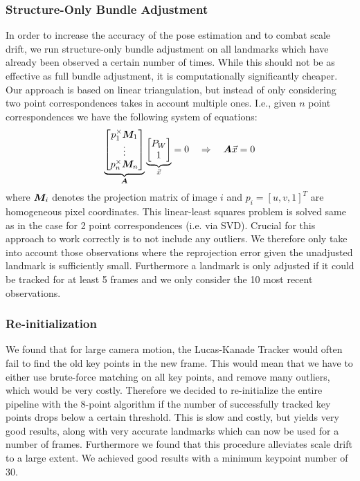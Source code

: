 \documentclass[11pt]{article}
\newcommand{\mat}{\matrixsym}
\begin{document}
\subsubsection{Structure-Only Bundle Adjustment}
In order to increase the accuracy of the pose estimation and to combat scale drift, we run structure-only bundle adjustment on all landmarks which have already been observed a certain number of times. While this should not be as effective as full bundle adjustment, it is computationally significantly cheaper.\\
Our approach is based on linear triangulation, but instead of only considering two point correspondences takes in account multiple ones. I.e., given $n$ point correspondences we have the following system of equations:
\begin{equation*}
\underbrace{\begin{bmatrix} p_1^\times \mat{M}_1\\ \vdots \\ p_n^\times \mat{M}_n \end{bmatrix}}_{\mat{A}} \underbrace{\begin{bmatrix} P_W \\ 1 \end{bmatrix}}_{\vec{x}} = 0 \quad \Rightarrow \quad \mat{A} \vec{x} = 0
\end{equation*}
where $\mat{M}_i$ denotes the projection matrix of image $i$ and $p_i = [u,v,1]^T$ are homogeneous pixel coordinates. This linear-least squares problem is solved same as in the case for 2 point correspondences (i.e. via SVD). Crucial for this approach to work correctly is to not include any outliers. We therefore only take into account those observations where the reprojection error given the unadjusted landmark is sufficiently small. Furthermore a landmark is only adjusted if it could be tracked for at least 5 frames and we only consider the 10 most recent observations.

\subsubsection{Re-initialization}
We found that for large camera motion, the Lucas-Kanade Tracker would often fail to find the old key points in the new frame. This would mean that we have to either use brute-force matching on all key points, and remove many outliers, which would be very costly. Therefore we decided to re-initialize the entire pipeline with the 8-point algorithm if the number of successfully tracked key points drops below a certain threshold. This is slow and costly, but yields very good results, along with very accurate landmarks which can now be used for a number of frames. Furthermore we found that this procedure alleviates scale drift to a large extent. We achieved good results with a minimum keypoint number of 30. 
\end{document}
